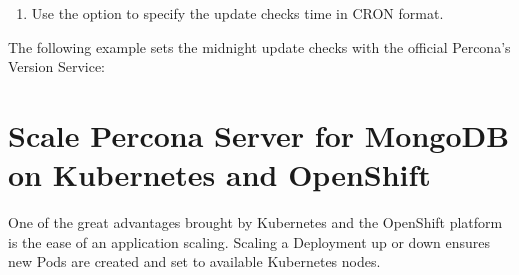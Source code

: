 \documentclass[letterpaper,10pt,english]{sphinxmanual}
\begin{document}
\begin{enumerate}
\begin{enumerate}
\item {} 
Alternatively, you can run Version Service inside your cluster. This
can be done with the  command as follows:

\begin{sphinxVerbatim}[commandchars=\\\{\}]
kubectl run version\PYGZhy{}service \PYGZhy{}\PYGZhy{}imageperconalab/version\PYGZhy{}service \PYGZhy{}\PYGZhy{}env \PYGZhy{}\PYGZhy{}port  \PYGZhy{}\PYGZhy{}expose
\end{sphinxVerbatim}

\end{enumerate}

\begin{sphinxadmonition}{note}{Note:}
Version Service is never checked if automatic updates are disabled.
If automatic updates are enabled, but Version Service URL can not be
reached, upgrades will not occur.
\end{sphinxadmonition}

\item {} 
Use the  option to specify the update checks time in CRON format.

\end{enumerate}

The following example sets the midnight update checks with the official
Percona’s Version Service:

\begin{sphinxVerbatim}[commandchars=\\\{\}]
   
     
     
     
\end{sphinxVerbatim}


\chapter{Scale Percona Server for MongoDB on Kubernetes and OpenShift}
\label{\detokenize{scaling:scale-percona-server-for-mongodb-on-kubernetes-and-openshift}}\label{\detokenize{scaling::doc}}
One of the great advantages brought by Kubernetes and the OpenShift
platform is the ease of an application scaling. Scaling a Deployment up
or down ensures new Pods are created and set to available Kubernetes
nodes.
\end{document}
